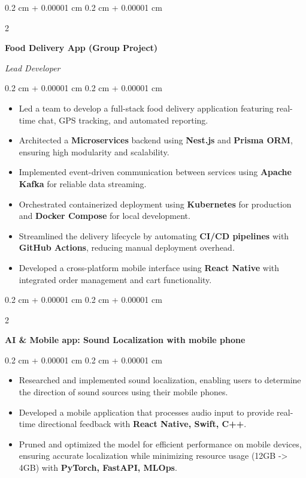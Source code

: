 \documentclass[10pt,letterpaper]{extarticle}
\newenvironment{highlights}{
    \begin{itemize}[
        topsep=0.10 cm,
        parsep=0.10 cm,
        partopsep=0pt,
        itemsep=0pt,
        leftmargin=0.4 cm + 10pt
    ]
}{
    \end{itemize}
} %
\newenvironment{onecolentry}{
    \begin{adjustwidth}{
        0.2 cm + 0.00001 cm
    }{
        0.2 cm + 0.00001 cm
    }
}{
    \end{adjustwidth}
} %
\newenvironment{twocolentry}[2][]{
    \onecolentry
    \def\secondColumn{#2}
    \setcolumnwidth{\fill, 5.0 cm}
    \begin{paracol}{2}
}{
    \switchcolumn \raggedleft \secondColumn
    \end{paracol}
    \endonecolentry
} %
\begin{document}
        \begin{twocolentry}{
            \textit{Lead Developer}}
            \textbf{Food Delivery App (Group Project)}
        \end{twocolentry}

        \begin{onecolentry}
            \begin{highlights}
                \item Led a team to develop a full-stack food delivery application featuring real-time chat, GPS tracking, and automated reporting.
                \item Architected a \textbf{Microservices} backend using \textbf{Nest.js} and \textbf{Prisma ORM}, ensuring high modularity and scalability.
                \item Implemented event-driven communication between services using \textbf{Apache Kafka} for reliable data streaming.
                \item Orchestrated containerized deployment using \textbf{Kubernetes} for production and \textbf{Docker Compose} for local development.
                \item Streamlined the delivery lifecycle by automating \textbf{CI/CD pipelines} with \textbf{GitHub Actions}, reducing manual deployment overhead.
                \item Developed a cross-platform mobile interface using \textbf{React Native} with integrated order management and cart functionality.
            \end{highlights}
        \end{onecolentry}

        \vspace{0.2 cm}

        \begin{twocolentry}{
            \textit{}}
            \textbf{AI \& Mobile app: Sound Localization with mobile phone}
        \end{twocolentry}

        \begin{onecolentry}
            \begin{highlights}
                \item Researched and implemented sound localization, enabling users to determine the direction of sound sources using their mobile phones.
                \item Developed a mobile application that processes audio input to provide real-time directional feedback with \textbf{React Native, Swift, C++}.
                \item Pruned and optimized the model for efficient performance on mobile devices, ensuring accurate localization while minimizing resource usage (12GB -> 4GB) with \textbf{PyTorch, FastAPI, MLOps}.
            \end{highlights}
        \end{onecolentry}
\end{document}
